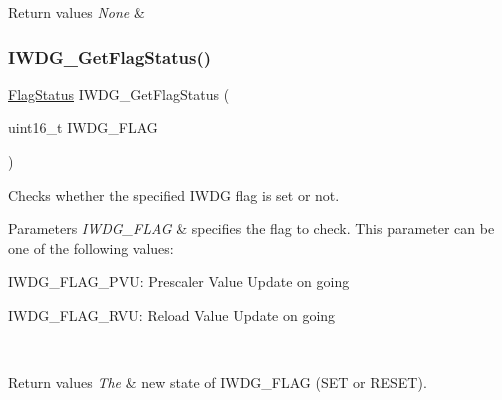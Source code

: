 \begin{DoxyRetVals}{Return values}
{\em None} & \\
\hline
\end{DoxyRetVals}
\mbox{\label{group___i_w_d_g___private___functions_ga37f050cfbedc0c15f9e0816c0b22011e}} 
\subsubsection{\texorpdfstring{IWDG\_GetFlagStatus()}{IWDG\_GetFlagStatus()}}
{\footnotesize\ttfamily \mbox{\hyperlink{group___exported__types_ga89136caac2e14c55151f527ac02daaff}{Flag\+Status}} I\+W\+D\+G\+\_\+\+Get\+Flag\+Status (\begin{DoxyParamCaption}\item[{uint16\+\_\+t}]{I\+W\+D\+G\+\_\+\+F\+L\+AG }\end{DoxyParamCaption})}



Checks whether the specified I\+W\+DG flag is set or not. 


\begin{DoxyParams}{Parameters}
{\em I\+W\+D\+G\+\_\+\+F\+L\+AG} & specifies the flag to check. This parameter can be one of the following values\+: \begin{DoxyItemize}
\item I\+W\+D\+G\+\_\+\+F\+L\+A\+G\+\_\+\+P\+VU\+: Prescaler Value Update on going \item I\+W\+D\+G\+\_\+\+F\+L\+A\+G\+\_\+\+R\+VU\+: Reload Value Update on going \end{DoxyItemize}
\\
\hline
\end{DoxyParams}

\begin{DoxyRetVals}{Return values}
{\em The} & new state of I\+W\+D\+G\+\_\+\+F\+L\+AG (S\+ET or R\+E\+S\+ET). \\
\hline
\end{DoxyRetVals}
\mbox{\label{group___i_w_d_g___private___functions_ga7147ebabdc3fef97f532b171a4e70d49}} 
